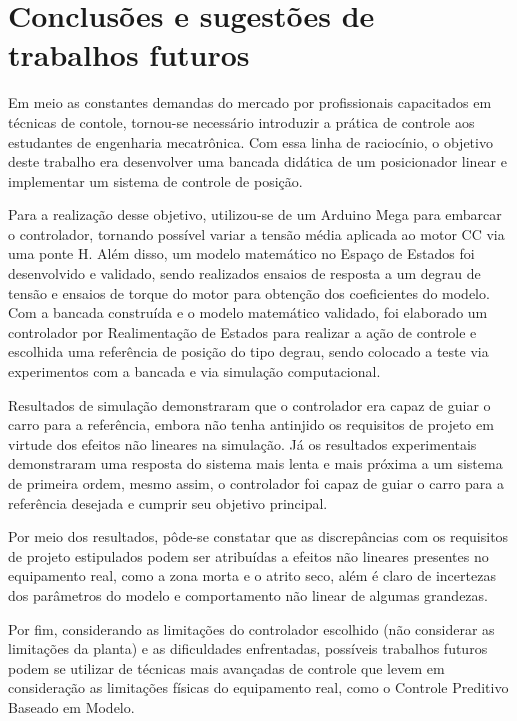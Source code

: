 \chapter{Conclusões e sugestões de trabalhos futuros}

Em meio as constantes demandas do mercado por profissionais capacitados em técnicas de contole, tornou-se necessário introduzir a prática de controle aos estudantes de engenharia mecatrônica. Com essa linha de raciocínio, o objetivo deste trabalho era desenvolver uma bancada didática de um posicionador linear e implementar um sistema de controle de posição.

Para a realização desse objetivo, utilizou-se de um Arduino Mega para embarcar o controlador, tornando possível variar a tensão média aplicada ao motor CC via uma ponte H. Além disso, um modelo matemático no Espaço de Estados foi desenvolvido e validado, sendo realizados ensaios de resposta a um degrau de tensão e ensaios de torque do motor para obtenção dos coeficientes do modelo. Com a bancada construída e o modelo matemático validado, foi elaborado um controlador por Realimentação de Estados para realizar a ação de controle e escolhida uma referência de posição do tipo degrau, sendo colocado a teste via experimentos com a bancada e via simulação computacional.

Resultados de simulação demonstraram que o controlador era capaz de guiar o carro para a referência, embora não tenha antinjido os requisitos de projeto em virtude dos efeitos não lineares na simulação. Já os resultados experimentais demonstraram uma resposta do sistema mais lenta e mais próxima a um sistema de primeira ordem, mesmo assim, o controlador foi capaz de guiar o carro para a referência desejada e cumprir seu objetivo principal.

Por meio dos resultados, pôde-se constatar que as discrepâncias com os requisitos de projeto estipulados podem ser atribuídas a efeitos não lineares presentes no equipamento real, como a zona morta e o atrito seco, além é claro de incertezas dos parâmetros do modelo e comportamento não linear de algumas grandezas. 

Por fim, considerando as limitações do controlador escolhido (não considerar as limitações da planta) e as dificuldades enfrentadas, possíveis trabalhos futuros podem se utilizar de técnicas mais avançadas de controle que levem em consideração as limitações físicas do equipamento real, como o Controle Preditivo Baseado em Modelo.